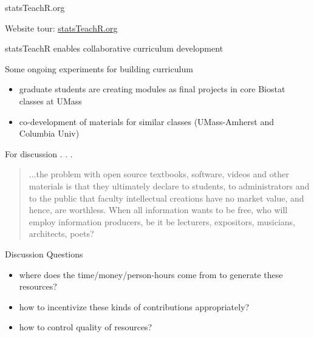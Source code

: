 
\begin{frame}{statsTeachR.org}

Website tour: \href{http://statsTeachR.org}{statsTeachR.org}

\end{frame}


\begin{frame}{statsTeachR enables collaborative curriculum development}

\begin{block}{Some ongoing experiments for building curriculum}
\begin{itemize}
        \item graduate students are creating modules as final projects in core Biostat classes at UMass
        \item co-development of materials for similar classes (UMass-Amherst and Columbia Univ) 
\end{itemize}
\end{block}


\end{frame}



\begin{frame}



\end{frame}


\begin{frame}{For discussion . . .}

 \begin{quote}
\footnotesize
...the problem with open source textbooks, software, videos and other materials is that they ultimately declare to students, to administrators and to the public that faculty intellectual creations have no market value, and hence, are worthless.  When all information wants to be free, who will employ information producers, be it be lecturers, expositors, musicians, architects, poets?
\end{quote}

\end{frame}


\begin{frame}{Discussion Questions}

\begin{itemize}
        \item where does the time/money/person-hours come from to generate these resources?
        \item how to incentivize these kinds of contributions appropriately?
        \item how to control quality of resources?
\end{itemize}

\end{frame}



